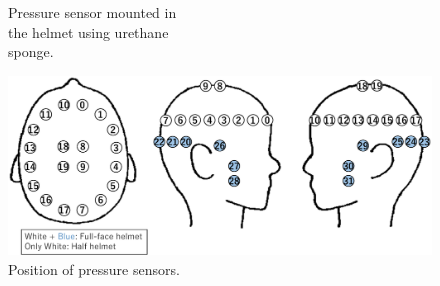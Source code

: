 \documentclass[english,preprint,JIP]{ipsj}
\begin{document}
\begin{figure}[!t]
\begin{minipage}{0.48\hsize}
\begin{center}
        \end{center}
  \caption{Pressure sensor mounted in\\the helmet using urethane\\sponge.}
  \label{fig:sensor}
  \end{minipage}
\end{figure}

\begin{figure}[!t]
  \begin{center}
    \includegraphics[width=1\linewidth]{figure/position.eps}
  \end{center}
  \caption{Position of pressure sensors.}
  \label{fig:position}
\end{figure}
\end{document}
